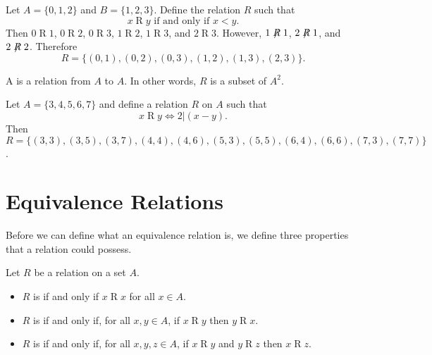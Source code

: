 \begin{example}
    Let $A = \{0, 1, 2\}$ and $B = \{1, 2, 3\}$. Define the relation $R$ such that
    \[
        x\mathrel{R}y \text{ if and only if } x < y.
    \]
    Then $0\mathrel{R}1$, $0\mathrel{R}2$, $0\mathrel{R}3$, $1\mathrel{R}2$, $1\mathrel{R}3$, and $2\mathrel{R}3$. However, $1\not\mathrel{R}1$, $2\not\mathrel{R}1$, and $2\not\mathrel{R}2$. Therefore
    \[
        R = \{(0, 1), (0, 2), (0, 3), (1, 2), (1, 3), (2, 3)\}.
    \]
\end{example}

\begin{definition}
    A  is a relation from $A$ to $A$. In other words, $R$ is a subset of $A^2$.
\end{definition}
\begin{example}
    Let $A = \{3, 4, 5, 6, 7\}$ and define a relation $R$ on $A$ such that
    \[
        x\mathrel{R}y \iff 2 \vert (x-y).
    \]
    Then $R = \{(3, 3), (3, 5), (3, 7), (4, 4), (4, 6), (5, 3), (5, 5), (6, 4), (6, 6), (7, 3), (7, 7)\}$.
\end{example}

\section{Equivalence Relations}
Before we can define what an equivalence relation is, we define three properties that a relation could possess.
\begin{definition}
    Let $R$ be a relation on a set $A$.
    \begin{itemize}
        \item $R$ is  if and only if $x\mathrel{R}x$ for all $x \in A$.
        \item $R$ is  if and only if, for all $x, y \in A$, if $x\mathrel{R}y$ then $y\mathrel{R}x$.
        \item $R$ is  if and only if, for all $x,y,z\in A$, if $x\mathrel{R}y$ and $y\mathrel{R}z$ then $x\mathrel{R}z$.
    \end{itemize}
\end{definition}

